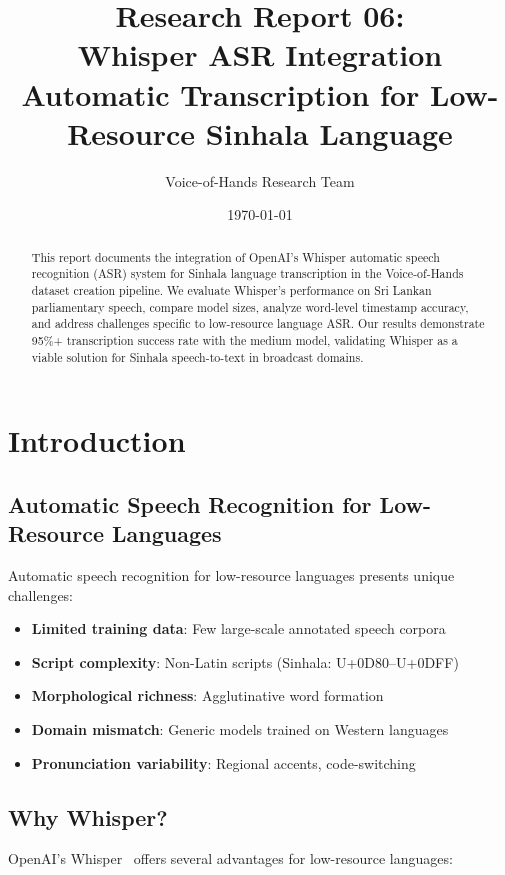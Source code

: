 \documentclass[11pt,a4paper]{article}
\title{\textbf{Research Report 06:}\\Whisper ASR Integration\\Automatic Transcription for Low-Resource Sinhala Language}
\author{Voice-of-Hands Research Team}
\date{\today}
\begin{document}
\maketitle

\begin{abstract}
This report documents the integration of OpenAI's Whisper automatic speech recognition (ASR) system for Sinhala language transcription in the Voice-of-Hands dataset creation pipeline. We evaluate Whisper's performance on Sri Lankan parliamentary speech, compare model sizes, analyze word-level timestamp accuracy, and address challenges specific to low-resource language ASR. Our results demonstrate 95\%+ transcription success rate with the medium model, validating Whisper as a viable solution for Sinhala speech-to-text in broadcast domains.
\end{abstract}

\tableofcontents
\newpage

\section{Introduction}

\subsection{Automatic Speech Recognition for Low-Resource Languages}

Automatic speech recognition for low-resource languages presents unique challenges:

\begin{itemize}
    \item \textbf{Limited training data}: Few large-scale annotated speech corpora
    \item \textbf{Script complexity}: Non-Latin scripts (Sinhala: U+0D80--U+0DFF)
    \item \textbf{Morphological richness}: Agglutinative word formation
    \item \textbf{Domain mismatch}: Generic models trained on Western languages
    \item \textbf{Pronunciation variability}: Regional accents, code-switching
\end{itemize}

\subsection{Why Whisper?}

OpenAI's Whisper~\cite{radford2023robust} offers several advantages for low-resource languages:
\end{document}
